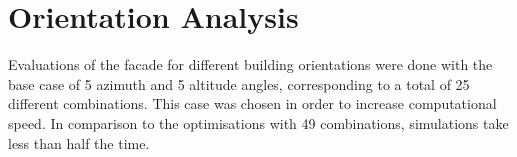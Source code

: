 \section{Orientation Analysis}

	Evaluations of the facade for different building orientations were done with the base case of 5 azimuth and 5 altitude angles, corresponding to a total of 25 different combinations. This case was chosen in order to increase computational speed. In comparison to the optimisations with 49 combinations, simulations take less than half the time.%

